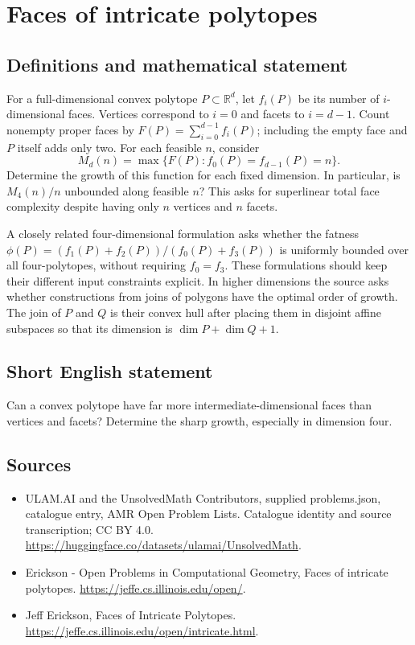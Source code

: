 \documentclass[11pt,a4paper]{article}
\begin{document}
\section*{Faces of intricate polytopes}\label{statement}

\subsection{Definitions and mathematical statement}
For a full-dimensional convex polytope $P\subset\mathbb R^d$, let $f_i(P)$
be its number of $i$-dimensional faces. Vertices correspond to $i=0$ and
facets to $i=d-1$. Count nonempty proper faces by
$F(P)=\sum_{i=0}^{d-1}f_i(P)$; including the empty face and $P$ itself adds
only two. For each feasible $n$, consider
\[
 M_d(n)=\max\{F(P):f_0(P)=f_{d-1}(P)=n\}.
\]
Determine the growth of this function for each fixed dimension. In
particular, is $M_4(n)/n$ unbounded along feasible $n$? This asks for
superlinear total face complexity despite having only $n$ vertices and
$n$ facets.

A closely related four-dimensional formulation asks whether the fatness
$\phi(P)=(f_1(P)+f_2(P))/(f_0(P)+f_3(P))$ is uniformly bounded over all
four-polytopes, without requiring $f_0=f_3$. These formulations should keep
their different input constraints explicit.
In higher dimensions the source asks whether constructions from joins of
polygons have the optimal order of growth. The join of $P$ and $Q$ is their
convex hull after placing them in disjoint affine subspaces so that its
dimension is $\dim P+\dim Q+1$.
\subsection{Short English statement}
Can a convex polytope have far more intermediate-dimensional faces than
vertices and facets? Determine the sharp growth, especially in dimension four.
\subsection{Sources}
\begin{itemize}
\item[S1] ULAM.AI and the UnsolvedMath Contributors, supplied problems.json, catalogue entry, AMR Open Problem Lists. Catalogue identity and source transcription; CC BY 4.0.
\url{https://huggingface.co/datasets/ulamai/UnsolvedMath}.
\item[S2] Erickson - Open Problems in Computational Geometry, Faces of intricate polytopes. 
\url{https://jeffe.cs.illinois.edu/open/}.
\item[S3] Jeff Erickson, Faces of Intricate Polytopes.
\url{https://jeffe.cs.illinois.edu/open/intricate.html}.
\end{itemize}
\end{document}
